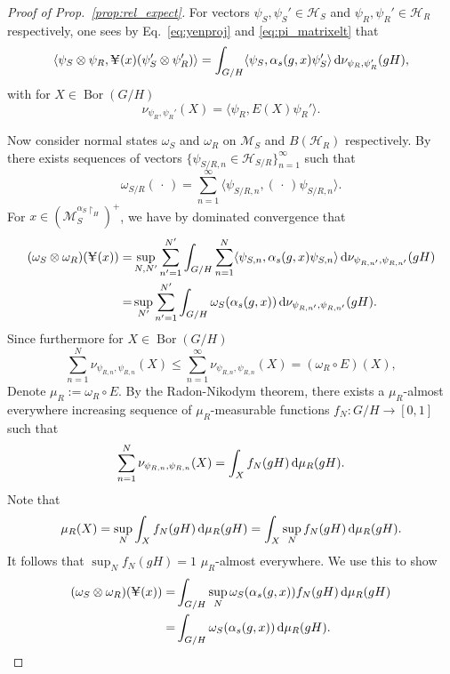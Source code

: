 \documentclass[sn-mathphys-num]{sn-jnl}%
\newcommand{\HH}{\mathcal{H}}
\newcommand{\MM}{\mathcal{M}}
\DeclareMathOperator{\Bor}{Bor}
\newcommand{\diff}{\textup{d}}
\numberwithin{equation}{section}
\theoremstyle{thmstyleone}%
\theoremstyle{thmstyletwo}%
\theoremstyle{thmstylethree}%
\begin{document}
    \begin{proof}[Proof of Prop.~\ref{prop:rel_expect}]
    For vectors $\psi_S,\psi_S'\in\HH_S$ and $\psi_R,\psi_R'\in\HH_R$ respectively, one sees by Eq.\ \eqref{eq:yenproj} and \eqref{eq:pi_matrixelt} that
    \begin{equation}
            \langle \psi_S\otimes\psi_R,\yen(x)(\psi_S'\otimes\psi_R')\rangle=\int_{G/H} \langle\psi_S,\alpha_s(g,x)\psi_S'\rangle\, \diff\nu_{\psi_R,\psi_R'}(gH),
        \end{equation}
        with for $X\in \Bor(G/H)$
        \begin{equation}
            \nu_{\psi_R,\psi_R'}(X)=\langle \psi_R,E(X)\psi_R'\rangle.
        \end{equation}
    
        
    Now consider normal states $\omega_S$ and $\omega_R$ on $\MM_S$ and $B(\HH_R)$ respectively. By \cite[Thm.~7.1.12]{kadison1997fundamentals} there exists sequences of vectors $\{\psi_{S/R,n}\in \HH_{S/R}\}_{n=1}^\infty$ such that
    \begin{equation}
        \omega_{S/R}(\,\cdot\,)=\sum_{n=1}^\infty \langle \psi_{S/R,n},(\,\cdot\,)\psi_{S/R,n}\rangle.
    \end{equation}
    For $x\in \left(\MM_S^{\alpha_S\restriction_H}\right)^+$, we have by dominated convergence that
    \begin{align}
        (\omega_S\otimes\omega_R)(\yen(x))=&\sup_{N,N'}\sum_{n'=1}^{N'}\int_{G/H} \sum_{n=1}^N\langle\psi_{S,n},\alpha_s(g,x)\psi_{S,n}\rangle \,\diff\nu_{\psi_{R,n'},\psi_{R,n'}}(gH)\nonumber\\
        =&\sup_{N'}\sum_{n'=1}^{N'}\int_{G/H} \omega_{S}(\alpha_s(g,x)) \,\diff\nu_{\psi_{R,n'},\psi_{R,n'}}(gH).
    \end{align}
    Since furthermore for $X\in \Bor(G/H)$
    \begin{equation}
        \sum_{n=1}^{N}\nu_{\psi_{R,n},\psi_{R,n}}(X)\leq \sum_{n=1}^{\infty}\nu_{\psi_{R,n},\psi_{R,n}}(X)=(\omega_R\circ E)(X),
    \end{equation}
    Denote $\mu_R:=\omega_R\circ E$. By the Radon-Nikodym theorem, there exists a $\mu_R$-almost everywhere increasing sequence of $\mu_R$-measurable functions $f_{N}:G/H\to [0,1]$ such that
    \begin{equation}
        \sum_{n=1}^{N}\nu_{\psi_{R,n},\psi_{R,n}}(X)=\int_X f_N(gH)\,\diff\mu_R(gH).
    \end{equation}
    Note that
    \begin{equation}
        \mu_R(X)=\sup_{N}\int_X f_N(gH)\,\diff\mu_R(gH)=\int_X \sup_{N}f_N(gH)\,\diff\mu_R(gH).
    \end{equation}
    It follows that $\sup_{N}f_N(gH)=1$ $\mu_R$-almost everywhere. We use this to show
    \begin{align}
        (\omega_S\otimes\omega_R)(\yen(x))=&\int_{G/H} \sup_{N}\omega_{S}(\alpha_s(g,x)) f_N(gH)\,\diff\mu_R(gH)\nonumber\\
        =&\int_{G/H} \omega_{S}(\alpha_s(g,x)) \,\diff\mu_R(gH).
    \end{align}
    \end{proof}
\end{document}
